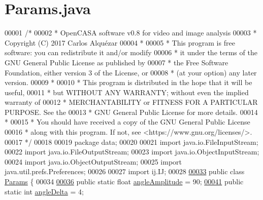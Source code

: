 \hypertarget{_params_8java_source}{}\section{Params.\+java}
\label{_params_8java_source}

\begin{DoxyCode}
00001 \textcolor{comment}{/*}
00002 \textcolor{comment}{ *   OpenCASA software v0.8 for video and image analysis}
00003 \textcolor{comment}{ *   Copyright (C) 2017  Carlos Alquézar}
00004 \textcolor{comment}{ *}
00005 \textcolor{comment}{ *   This program is free software: you can redistribute it and/or modify}
00006 \textcolor{comment}{ *   it under the terms of the GNU General Public License as published by}
00007 \textcolor{comment}{ *   the Free Software Foundation, either version 3 of the License, or}
00008 \textcolor{comment}{ *   (at your option) any later version.}
00009 \textcolor{comment}{ *}
00010 \textcolor{comment}{ *   This program is distributed in the hope that it will be useful,}
00011 \textcolor{comment}{ *   but WITHOUT ANY WARRANTY; without even the implied warranty of}
00012 \textcolor{comment}{ *   MERCHANTABILITY or FITNESS FOR A PARTICULAR PURPOSE.  See the}
00013 \textcolor{comment}{ *   GNU General Public License for more details.}
00014 \textcolor{comment}{ *}
00015 \textcolor{comment}{ *   You should have received a copy of the GNU General Public License}
00016 \textcolor{comment}{ *   along with this program.  If not, see <https://www.gnu.org/licenses/>.}
00017 \textcolor{comment}{*/}    
00018 
00019 \textcolor{keyword}{package }data;
00020 
00021 \textcolor{keyword}{import} java.io.FileInputStream;
00022 \textcolor{keyword}{import} java.io.FileOutputStream;
00023 \textcolor{keyword}{import} java.io.ObjectInputStream;
00024 \textcolor{keyword}{import} java.io.ObjectOutputStream;
00025 \textcolor{keyword}{import} java.util.prefs.Preferences;
00026 
00027 \textcolor{keyword}{import} ij.IJ;
00028 
\hypertarget{_params_8java_source_l00033}{}\hyperlink{classdata_1_1_params}{00033} \textcolor{keyword}{public} \textcolor{keyword}{class }\hyperlink{classdata_1_1_params}{Params} \{
00034 
\hypertarget{_params_8java_source_l00036}{}\hyperlink{classdata_1_1_params_a42568ad774d8f4ccb9535aeda39fc883}{00036}   \textcolor{keyword}{public} \textcolor{keyword}{static} \textcolor{keywordtype}{float}   \hyperlink{classdata_1_1_params_a42568ad774d8f4ccb9535aeda39fc883}{angleAmplitude}       = 90;
\hypertarget{_params_8java_source_l00041}{}\hyperlink{classdata_1_1_params_a93caa48162e34b2227a839ed71b4ed44}{00041}   \textcolor{keyword}{public} \textcolor{keyword}{static} \textcolor{keywordtype}{int}     \hyperlink{classdata_1_1_params_a93caa48162e34b2227a839ed71b4ed44}{angleDelta}           = 4;

\end{DoxyCode}
